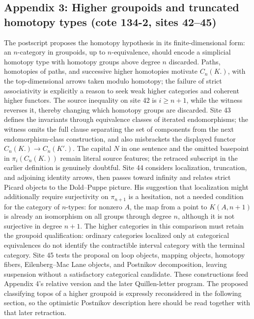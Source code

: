 \documentclass[10pt,oneside]{book}
\begin{document}
\subsection*{Appendix 3: Higher groupoids and truncated homotopy types (cote 134-2, sites 42--45)}
The postscript proposes the homotopy hypothesis in its finite-dimensional form: an $n$-category in groupoids, up to $n$-equivalence, should encode a simplicial homotopy type with homotopy groups above degree $n$ discarded. Paths, homotopies of paths, and successive higher homotopies motivate $C_n(K.)$, with the top-dimensional arrows taken modulo homotopy; the failure of strict associativity is explicitly a reason to seek weak higher categories and coherent higher functors. The source inequality on site 42 is $i\geq n+1$, while the witness reverses it, thereby changing which homotopy groups are discarded. Site 43 defines the invariants through equivalence classes of iterated endomorphisms; the witness omits the full clause separating the set of components from the next endomorphism-class construction, and also misbrackets the displayed functor $C_n(K.)\to C_n(K'.)$. The capital $N$ in one sentence and the omitted basepoint in $\pi_i(C_n(K.))$ remain literal source features; the retraced subscript in the earlier definition is genuinely doubtful. Site 44 considers localization, truncation, and adjoining identity arrows, then passes toward infinity and relates strict Picard objects to the Dold--Puppe picture. His suggestion that localization might additionally require surjectivity on $\pi_{n+1}$ is a hesitation, not a needed condition for the category of $n$-types: for nonzero $A$, the map from a point to $K(A,n+1)$ is already an isomorphism on all groups through degree $n$, although it is not surjective in degree $n+1$. The higher categories in this comparison must retain the groupoid qualification: ordinary categories localized only at categorical equivalences do not identify the contractible interval category with the terminal category. Site 45 tests the proposal on loop objects, mapping objects, homotopy fibers, Eilenberg--Mac Lane objects, and Postnikov decomposition, leaving suspension without a satisfactory categorical candidate. These constructions feed Appendix 4's relative version and the later Quillen-letter program. The proposed classifying topos of a higher groupoid is expressly reconsidered in the following section, so the optimistic Postnikov description here should be read together with that later retraction.
\end{document}

